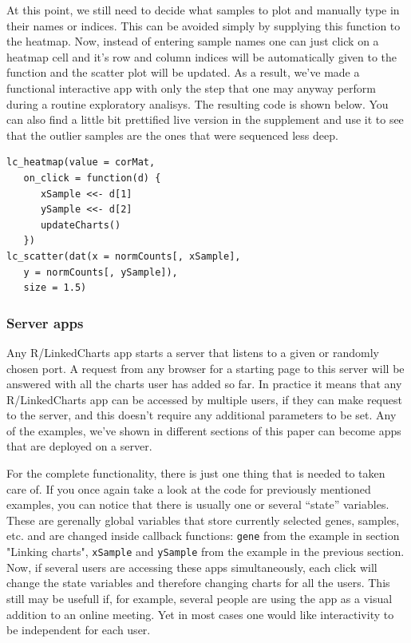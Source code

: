 \documentclass[twocolumn,10pt]{article}
\begin{document}
At this point, we still need to decide what samples to plot and manually type in their names or indices. This can be avoided simply by supplying this function to the heatmap. Now, instead of entering sample names one can just click on a heatmap cell and it's row and column indices will be automatically given to the function and the scatter plot will be updated. As a result, we've made a functional interactive app with only the step that one may anyway perform during a routine exploratory analisys. The resulting code is shown below. You can also find a little bit prettified live version in the supplement and use it to see that the outlier samples are the ones that were sequenced less deep.

\begin{verbatim}
lc_heatmap(value = corMat,
   on_click = function(d) {
      xSample <<- d[1]
      ySample <<- d[2]
      updateCharts()
   })
lc_scatter(dat(x = normCounts[, xSample], 
   y = normCounts[, ySample]),
   size = 1.5)
\end{verbatim}

\subsubsection{Server apps}

Any R/LinkedCharts app starts a server that listens to a given or randomly chosen port. A request from any browser for a starting page to this server will be answered with all the charts user has added so far. In practice it means that any R/LinkedCharts app can be accessed by multiple users, if they can make request to the server, and this doesn't require any additional parameters to be set. Any of the examples, we've shown in different sections of this paper can become apps that are deployed on a server.

For the complete functionality, there is just one thing that is needed to taken care of. If you once again take a look at the code for previously mentioned examples, you can notice that there is usually one or several ``state'' variables. These are gerenally global variables that store currently selected genes, samples, etc. and are changed inside callback functions: \texttt{gene} from the example in section "Linking charts", \texttt{xSample} and \texttt{ySample} from the example in the previous section. Now, if several users are accessing these apps simultaneously, each click will change the state variables and therefore changing charts for all the users. This still may be usefull if, for example, several people are using the app as a visual addition to an online meeting. Yet in most cases one would like interactivity to be independent for each user.
\end{document}
